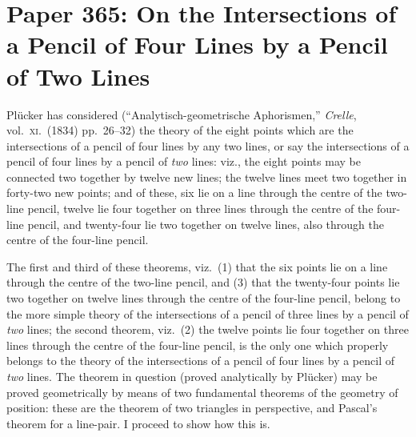 \documentclass[11pt]{article}
\begin{document}
\section*{Paper 365: On the Intersections of a Pencil of Four Lines by a Pencil of Two Lines}

\medskip{}

\medskip
Pl\"ucker has considered (``Analytisch-geometrische Aphorismen,'' \emph{Crelle}, vol.\ \textsc{xi}.\ (1834) pp.\ 26--32) the theory of the eight points which are the intersections of a pencil of four lines by any two lines, or say the intersections of a pencil of four lines by a pencil of \emph{two} lines: viz., the eight points may be connected two together by twelve new lines; the twelve lines meet two together in forty-two new points; and of these, six lie on a line through the centre of the two-line pencil, twelve lie four together on three lines through the centre of the four-line pencil, and twenty-four lie two together on twelve lines, also through the centre of the four-line pencil.

The first and third of these theorems, viz.\ (1) that the six points lie on a line through the centre of the two-line pencil, and (3) that the twenty-four points lie two together on twelve lines through the centre of the four-line pencil, belong to the more simple theory of the intersections of a pencil of three lines by a pencil of \emph{two} lines; the second theorem, viz.\ (2) the twelve points lie four together on three lines through the centre of the four-line pencil, is the only one which properly belongs to the theory of the intersections of a pencil of four lines by a pencil of \emph{two} lines. The theorem in question (proved analytically by Pl\"ucker) may be proved geometrically by means of two fundamental theorems of the geometry of position: these are the theorem of two triangles in perspective, and Pascal's theorem for a line-pair. I proceed to show how this is.
\end{document}
